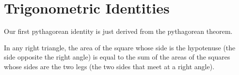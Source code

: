 \section{Trigonometric Identities}
Our first pythagorean identity is just derived from the pythagorean theorem.
\begin{theorem}
  In any right triangle, the area of the square whose side is the hypotenuse (the side opposite the right angle) is equal to the sum of the areas of the squares whose sides are the two legs (the two sides that meet at a right angle).
  \label{th:pythagoras}
\end{theorem}
\begin{figure}[H]
  \begin{center}
    \hspace{0.1\textwidth}
  \end{center}
\end{figure}

